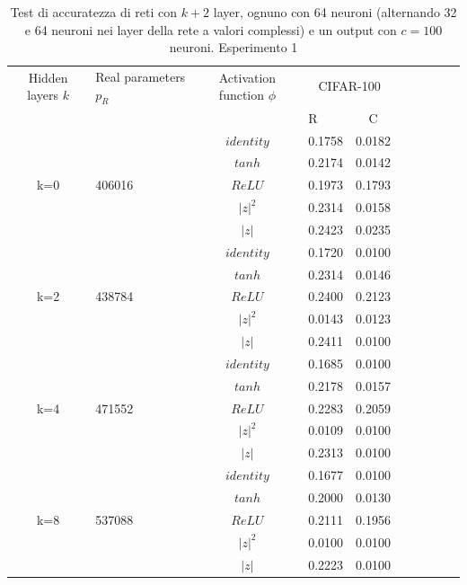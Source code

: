 \documentclass[a4paper,10pt]{article}
\begin{document}
 
 \begin{table}
  \centering
  \begin{tabular}{cp{} cp{}   cp{} cp{} cp{}}
   \cline{1-5}
   Hidden layers $k$ & Real parameters $p_R$ & Activation function $\phi$ & \multicolumn{2}{c}{CIFAR-100}\\
   \cline{4-5}
   & & & R & C \\
   \cline{1-5}
   & & $identity$ & 0.1758 & 0.0182 \\
   \cline{3-5}
   & & $tanh$ & 0.2174 & 0.0142 \\
   \cline{3-5}
   k=0 & 406016 & $ReLU$ & 0.1973 & 0.1793 \\
   \cline{3-5}
   & & $|z|^2$ & 0.2314 & 0.0158 \\
   \cline{3-5}
   & & $|z|$ & 0.2423 & 0.0235 \\
   \cline{1-5}
  
   & & $identity$ & 0.1720 & 0.0100 \\
   \cline{3-5}
   & & $tanh$ & 0.2314 & 0.0146 \\
   \cline{3-5}
   k=2 & 438784 & $ReLU$ & 0.2400 & 0.2123 \\
   \cline{3-5}
   & & $|z|^2$ & 0.0143 & 0.0123 \\
   \cline{3-5}
   & & $|z|$ & 0.2411 & 0.0100 \\
   \cline{1-5}
  
   & & $identity$ & 0.1685 & 0.0100 \\
   \cline{3-5}
   & & $tanh$ & 0.2178 & 0.0157 \\
   \cline{3-5}
   k=4 & 471552 & $ReLU$ & 0.2283 & 0.2059 \\
   \cline{3-5}
   & & $|z|^2$ & 0.0109 & 0.0100 \\
   \cline{3-5}
   & & $|z|$ & 0.2313 & 0.0100 \\
   \cline{1-5}
   
   & & $identity$ & 0.1677 & 0.0100 \\
   \cline{3-5}
   & & $tanh$ & 0.2000 & 0.0130 \\
   \cline{3-5}
   k=8 & 537088 & $ReLU$ & 0.2111 & 0.1956 \\
   \cline{3-5}
   & & $|z|^2$ & 0.0100 & 0.0100 \\
   \cline{3-5}
   & & $|z|$ & 0.2223 & 0.0100 \\
   \cline{1-5}
  \end{tabular}
  \caption{Test di accuratezza di reti con $k+2$ layer, ognuno con 64 neuroni (alternando 32 e 64 neuroni nei layer della rete a valori complessi) e un output con $c=100$ neuroni. Esperimento 1}
  \label{CIFAR-1001Tab}
 \end{table}
 
\end{document}
